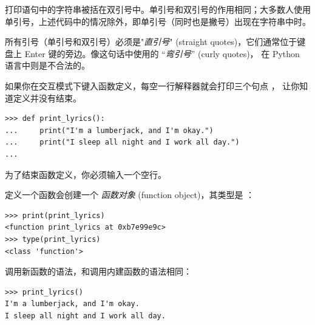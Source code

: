 打印语句中的字符串被括在双引号中。单引号和双引号的作用相同；大多数人使用单引号，上述代码中的情况除外，即单引号（同时也是撇号）出现在字符串中时。


所有引号（单引号和双引号）必须是"{\em 直引号}" (straight quotes)，它们通常位于键盘上 Enter 键的旁边。像这句话中使用的 ``{\em 弯引号}'' (curly quotes)， 在 Python 语言中则是不合法的。


如果你在交互模式下键入函数定义，每空一行解释器就会打印三个句点 ，
让你知道定义并没有结束。

\begin{lstlisting}
>>> def print_lyrics():
...     print("I'm a lumberjack, and I'm okay.")
...     print("I sleep all night and I work all day.")
...
\end{lstlisting}

%

为了结束函数定义，你必须输入一个空行。


定义一个函数会创建一个 {\em 函数对象} (function object)，其类型是 ：
  
  

\begin{lstlisting}
>>> print(print_lyrics)
<function print_lyrics at 0xb7e99e9c>
>>> type(print_lyrics)
<class 'function'>
\end{lstlisting}

%

调用新函数的语法，和调用内建函数的语法相同：

\begin{lstlisting}
>>> print_lyrics()
I'm a lumberjack, and I'm okay.
I sleep all night and I work all day.
\end{lstlisting}

%

